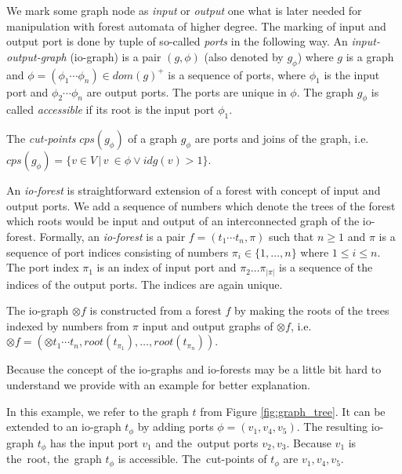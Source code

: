 \documentclass[a4paper, 12pt]{article}
\begin{document}

We mark some graph node as \emph{input} or \emph{output} one what is later needed for manipulation
with forest automata of higher degree.
The marking of input and output port is done by tuple of so-called \emph{ports} in the following way.
An \emph{input-output-graph} (io-graph) is a pair $(g,\phi)$ (also denoted by $g_\phi$)
where $g$ is a graph and $\phi=(\phi_1 \cdots \phi_n) \in dom(g)^+$ is a sequence of ports,
where $\phi_1$ is the input port and $\phi_2 \cdots \phi_n$ are output ports.
The ports are unique in $\phi$.
The graph $g_\phi$ is called \emph{accessible} if its root is the input port $\phi_1$.

The \emph{cut-points} $cps(g_\phi)$ of a graph $g_\phi$ are ports and joins of the graph,
i.e. $cps(g_\phi)=\{v \in V\,|\, v~\in \phi \vee idg(v) > 1\}$.

An \emph{io-forest} is straightforward extension of a forest with concept of input and output ports.
We add a sequence of numbers which denote the trees of the forest which roots would
be input and output of an interconnected graph of the io-forest.
Formally, an \emph{io-forest} is a pair $f=(t_1 \cdots t_n, \pi)$ such that $n \geq 1$ and $\pi$
is a sequence of port indices consisting of numbers $\pi_i \in \{1,\ldots,n\}$ where $1 \leq i \leq n$.
The port index $\pi_1$ is an index of input port and $\pi_2 \ldots \pi_{|\pi|}$ is a sequence of
the indices of the output ports.
The indices are again unique.

The io-graph $\otimes f$ is constructed from a forest $f$ by making
the roots of the trees indexed by numbers from $\pi$ input and output graphs
of $\otimes f$, i.e. $\otimes f = (\otimes t_1 \cdots t_n,root(t_{\pi_{1}}),\ldots,root(t_{\pi_{n}}))$.

Because the concept of the io-graphs and io-forests may be a little bit
hard to understand we provide with an example for better explanation.

\bexmp
In this example, we refer to the graph $t$ from Figure \ref{fig:graph_tree}.
It can be extended to an io-graph $t_\phi$ by adding ports $\phi=(v_1,v_4,v_5)$.
The resulting io-graph $t_\phi$ has the input port $v_1$ and the~output ports $v_2,v_3$.
Because $v_1$ is the~root, the~graph $t_\phi$ is accessible.
The~cut-points of $t_\phi$ are $v_1, v_4, v_5$.
\end{document}
